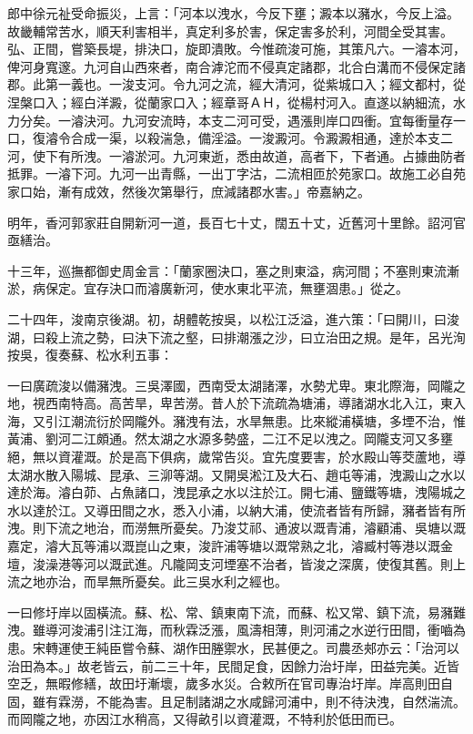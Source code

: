 郎中徐元祉受命振災，上言：「河本以洩水，今反下壅；澱本以瀦水，今反上溢。故畿輔常苦水，順天利害相半，真定利多於害，保定害多於利，河間全受其害。弘、正間，嘗築長堤，排決口，旋即潰敗。今惟疏浚可施，其策凡六。一濬本河，俾河身寬邃。九河自山西來者，南合滹沱而不侵真定諸郡，北合白溝而不侵保定諸郡。此第一義也。一浚支河。令九河之流，經大清河，從紫城口入；經文都村，從涅槃口入；經白洋澱，從蘭家口入；經章哥ＡＨ，從楊村河入。直遂以納細流，水力分矣。一濬決河。九河安流時，本支二河可受，遇漲則岸口四衝。宜每衝量存一口，復濬令合成一渠，以殺湍急，備淫溢。一浚澱河。令澱澱相通，達於本支二河，使下有所洩。一濬淤河。九河東逝，悉由故道，高者下，下者通。占據曲防者抵罪。一濬下河。九河一出青縣，一出丁字沽，二流相匝於苑家口。故施工必自苑家口始，漸有成效，然後次第舉行，庶減諸郡水害。」帝嘉納之。

明年，香河郭家莊自開新河一道，長百七十丈，闊五十丈，近舊河十里餘。詔河官亟繕治。

十三年，巡撫都御史周金言：「蘭家圈決口，塞之則東溢，病河間；不塞則東流漸淤，病保定。宜存決口而濬廣新河，使水東北平流，無壅涸患。」從之。

二十四年，浚南京後湖。初，胡體乾按吳，以松江泛溢，進六策：「曰開川，曰浚湖，曰殺上流之勢，曰決下流之壑，曰排潮漲之沙，曰立治田之規。是年，呂光洵按吳，復奏蘇、松水利五事：

一曰廣疏浚以備瀦洩。三吳澤國，西南受太湖諸澤，水勢尤卑。東北際海，岡隴之地，視西南特高。高苦旱，卑苦澇。昔人於下流疏為塘浦，導諸湖水北入江，東入海，又引江潮流衍於岡隴外。瀦洩有法，水旱無患。比來縱浦橫塘，多堙不治，惟黃浦、劉河二江頗通。然太湖之水源多勢盛，二江不足以洩之。岡隴支河又多壅絕，無以資灌溉。於是高下俱病，歲常告災。宜先度要害，於水殿山等茭蘆地，導太湖水散入陽城、昆承、三泖等湖。又開吳淞江及大石、趙屯等浦，洩澱山之水以達於海。濬白茆、占魚諸口，洩昆承之水以注於江。開七浦、鹽鐵等塘，洩陽城之水以達於江。又導田間之水，悉入小浦，以納大浦，使流者皆有所歸，瀦者皆有所洩。則下流之地治，而澇無所憂矣。乃浚艾祁、通波以溉青浦，濬顧浦、吳塘以溉嘉定，濬大瓦等浦以溉崑山之東，浚許浦等塘以溉常熟之北，濬臧村等港以溉金壇，浚澡港等河以溉武進。凡隴岡支河堙塞不治者，皆浚之深廣，使復其舊。則上流之地亦治，而旱無所憂矣。此三吳水利之經也。

一曰修圩岸以固橫流。蘇、松、常、鎮東南下流，而蘇、松又常、鎮下流，易瀦難洩。雖導河浚浦引注江海，而秋霖泛漲，風濤相薄，則河浦之水逆行田間，衝嚙為患。宋轉運使王純臣嘗令蘇、湖作田塍禦水，民甚便之。司農丞郟亦云：「治河以治田為本。」故老皆云，前二三十年，民間足食，因餘力治圩岸，田益完美。近皆空乏，無暇修繕，故田圩漸壞，歲多水災。合敕所在官司專治圩岸。岸高則田自固，雖有霖澇，不能為害。且足制諸湖之水咸歸河浦中，則不待決洩，自然湍流。而岡隴之地，亦因江水稍高，又得畝引以資灌溉，不特利於低田而已。

